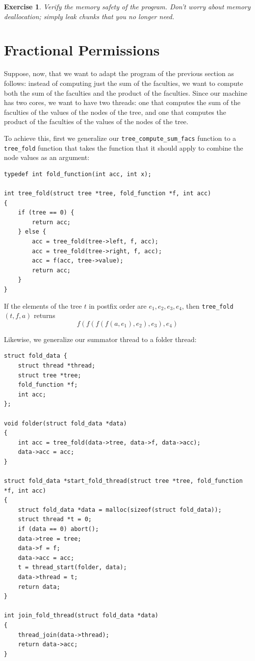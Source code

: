 \documentclass{article}
\newtheorem{exercise}{Exercise}
\begin{document}
\begin{exercise}\label{exercise:threads}
Verify the memory safety of the program. Don't worry about memory deallocation;
simply leak chunks that you no longer need.
\end{exercise}

\section{Fractional Permissions}\label{section:fractions}

Suppose, now, that we want to adapt the program of the previous
section as follows: instead of computing just the sum of the
faculties, we want to compute both the sum of the faculties and
the product of the faculties. Since our machine has two cores,
we want to have two threads: one that computes the sum of the
faculties of the values of the nodes of the tree, and one that
computes the product of the faculties of the values of the
nodes of the tree.

To achieve this, first we generalize our
\lstinline!tree_compute_sum_facs! function to a
\lstinline!tree_fold! function that takes the function that it
should apply to combine the node values as an argument:

\begin{lstlisting}
typedef int fold_function(int acc, int x);

int tree_fold(struct tree *tree, fold_function *f, int acc)
{
    if (tree == 0) {
        return acc;
    } else {
        acc = tree_fold(tree->left, f, acc);
        acc = tree_fold(tree->right, f, acc);
        acc = f(acc, tree->value);
        return acc;
    }
}
\end{lstlisting}

If the elements of the tree $t$ in postfix order are $e_1, e_2,
e_3, e_4$, then \lstinline!tree_fold!$(t, f, a)$ returns
$$f(f(f(f(a, e_1), e_2), e_3), e_4)$$

Likewise, we generalize our summator thread to a folder thread:

\begin{lstlisting}
struct fold_data {
    struct thread *thread;
    struct tree *tree;
    fold_function *f;
    int acc;
};

void folder(struct fold_data *data)
{
    int acc = tree_fold(data->tree, data->f, data->acc);
    data->acc = acc;
}

struct fold_data *start_fold_thread(struct tree *tree, fold_function *f, int acc)
{
    struct fold_data *data = malloc(sizeof(struct fold_data));
    struct thread *t = 0;
    if (data == 0) abort();
    data->tree = tree;
    data->f = f;
    data->acc = acc;
    t = thread_start(folder, data);
    data->thread = t;
    return data;
}

int join_fold_thread(struct fold_data *data)
{
    thread_join(data->thread);
    return data->acc;
}
\end{lstlisting}
\end{document}
